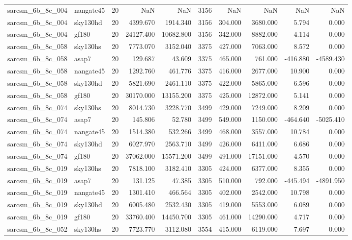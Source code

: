 \documentclass{article}
\begin{document}
\begin{longtable}{llrrrrrrrr}
sarcsm\_6b\_8c\_004 & nangate45 & 20 & NaN & NaN & 3156 & NaN & NaN & NaN & NaN \\
sarcsm\_6b\_8c\_004 & sky130hd & 20 & 4399.670 & 1914.340 & 3156 & 304.000 & 3680.000 & 5.794 & 0.000 \\
sarcsm\_6b\_8c\_004 & gf180 & 20 & 24127.400 & 10682.800 & 3156 & 342.000 & 8882.000 & 4.114 & 0.000 \\
sarcsm\_6b\_8c\_058 & sky130hs & 20 & 7773.070 & 3152.040 & 3375 & 427.000 & 7063.000 & 8.572 & 0.000 \\
sarcsm\_6b\_8c\_058 & asap7 & 20 & 129.687 & 43.609 & 3375 & 465.000 & 761.000 & -416.880 & -4589.430 \\
sarcsm\_6b\_8c\_058 & nangate45 & 20 & 1292.760 & 461.776 & 3375 & 416.000 & 2677.000 & 10.900 & 0.000 \\
sarcsm\_6b\_8c\_058 & sky130hd & 20 & 5821.690 & 2461.110 & 3375 & 422.000 & 5865.000 & 6.596 & 0.000 \\
sarcsm\_6b\_8c\_058 & gf180 & 20 & 30170.000 & 13155.200 & 3375 & 425.000 & 12872.000 & 5.141 & 0.000 \\
sarcsm\_6b\_8c\_074 & sky130hs & 20 & 8014.730 & 3228.770 & 3499 & 429.000 & 7249.000 & 8.209 & 0.000 \\
sarcsm\_6b\_8c\_074 & asap7 & 20 & 145.806 & 52.780 & 3499 & 549.000 & 1150.000 & -464.640 & -5025.410 \\
sarcsm\_6b\_8c\_074 & nangate45 & 20 & 1514.380 & 532.266 & 3499 & 468.000 & 3557.000 & 10.784 & 0.000 \\
sarcsm\_6b\_8c\_074 & sky130hd & 20 & 6027.970 & 2563.710 & 3499 & 426.000 & 6411.000 & 6.686 & 0.000 \\
sarcsm\_6b\_8c\_074 & gf180 & 20 & 37062.000 & 15571.200 & 3499 & 491.000 & 17151.000 & 4.570 & 0.000 \\
sarcsm\_6b\_8c\_019 & sky130hs & 20 & 7818.100 & 3182.410 & 3305 & 424.000 & 6377.000 & 8.355 & 0.000 \\
sarcsm\_6b\_8c\_019 & asap7 & 20 & 131.125 & 47.385 & 3305 & 510.000 & 792.000 & -445.494 & -4891.950 \\
sarcsm\_6b\_8c\_019 & nangate45 & 20 & 1301.410 & 466.564 & 3305 & 402.000 & 2542.000 & 10.798 & 0.000 \\
sarcsm\_6b\_8c\_019 & sky130hd & 20 & 6005.480 & 2532.430 & 3305 & 419.000 & 5553.000 & 6.089 & 0.000 \\
sarcsm\_6b\_8c\_019 & gf180 & 20 & 33760.400 & 14450.700 & 3305 & 461.000 & 14290.000 & 4.717 & 0.000 \\
sarcsm\_6b\_8c\_052 & sky130hs & 20 & 7723.770 & 3112.080 & 3554 & 415.000 & 6119.000 & 7.697 & 0.000 \\

\end{longtable}
\end{document}
